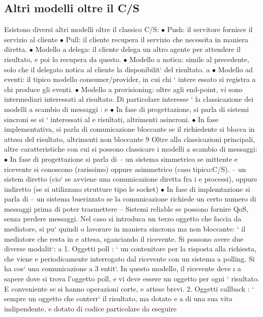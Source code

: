 \documentclass[a4paper,12pt]{article}
\begin{document}
\subsection{Altri modelli oltre il C/S}
Esistono diversi altri modelli oltre il classico C/S:
$\bullet$ Push: il servitore fornisce il servizio al cliente
$\bullet$ Pull: il cliente recupera il servizio che necessita in maniera diretta.
$\bullet$ Modello a delega: il cliente delega un altro agente per attendere il risultato,
e poi lo recupera da questo.
$\bullet$ Modello a notica: simile al precedente, solo che il delegato notica al
cliente la disponibilit` del risultato.
a
$\bullet$ Modello ad eventi: il tipico modello consumer/provider, in cui chi ` intere
essato si registra a chi produce gli eventi.
$\bullet$ Modello a provisioning: oltre agli end-point, vi sono intermediari interessati al risultato.
Di particolare interesse ` la classicazione dei modelli a scambio di messaggi :
e
$\bullet$ In fase di progettazione, si parla di sistemi sincroni se si ` interessati al
e
risultati, altrimenti asincroni.
$\bullet$ In fase implementativa, si parla di comunicazione bloccante se il richiedente
si blocca in attesa del risultato, altrimenti non bloccante
9
Oltre alla classicazioni principali, altre caratteristiche con cui si possono classicare i modelli a scambio di
messaggi:
$\bullet$ In fase di progettazione si parla di
-- un sistema simmetrico se mittente e ricevente si conoscono (rarissimo) oppure asimmetrico (caso tipico:C/S).
-- un sistem diretto (cio` se avviene una comunicazione diretta fra i
e
processi), oppure indiretto (se si utilizzano strutture tipo le socket)
$\bullet$ In fase di implemtazione si parla di
-- un sistema buerizzato se la comunicazione richiede un certo numero
di messaggi prima di poter trasmettere
-- Sistemi reliable se possono fornire QoS, senza perdere messaggi.
Nel caso si introduca un terzo oggetto che faccia da mediatore, si pu` quindi
o
lavorare in maniera sincrona ma non bloccante: ` il mediatore che resta in
e
attesa, sganciando il ricevente. Si possono avere due diverse modalit`:
a
1. Oggetti poll : ` un contenitore per la risposta alla richiesta, che viene
e
periodicamente interrogato dal ricevente con un sistema a polling. Si ha
cos` una comunicazione a 3 entit`. In questo modello, il ricevente deve
\i{}
a
sapere dove si trova l'oggetto poll, e vi deve essere un oggetto per ogni
`
risultato. E conveniente se si hanno operazioni corte, e attese brevi.
2. Oggetti callback : ` sempre un oggetto che conterr` il risultato, ma dotato
e
a
di una sua vita indipendente, e dotato di codice particolare da eseguire
\end{document}
